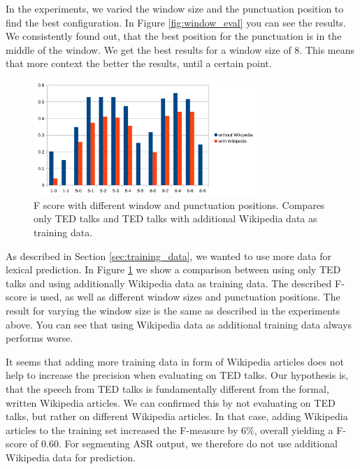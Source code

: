 In the experiments, we varied the window size and the punctuation position to find the best configuration.
In Figure \ref{fig:window_eval} you can see the results.
We consistently found out, that the best position for the punctuation is in the middle of the window.
We get the best results for a window size of 8.
This means that more context the better the results, until a certain point.

\begin{figure}[ht]
    \centering
    \includegraphics[width=0.75\textwidth]{img/window_wiki_eval.png}
    \caption{F score with different window and punctuation positions. Compares only TED talks and TED talks with additional Wikipedia data as training data.}
    \label{fig:window_wiki_eval}
\end{figure}

As described in Section \ref{sec:training_data}, we wanted to use more data for lexical prediction.
In Figure \ref{fig:window_wiki_eval} we show a comparison between using only TED talks and using additionally Wikipedia data as training data.
The described F-score is used, as well as different window sizes and punctuation positions.
The result for varying the window size is the same as described in the experiments above.
You can see that using Wikipedia data as additional training data always performs worse.

It seems that adding more training data in form of Wikipedia articles does not help to increase the precision when evaluating on TED talks.
Our hypothesis is, that the speech from TED talks is fundamentally different from the formal, written Wikipedia articles.
We can confirmed this by not evaluating on TED talks, but rather on different Wikipedia articles.
In that case, adding Wikipedia articles to the training set increased the F-measure by 6\%, overall yielding a F-score of 0.60.
For segmenting ASR output, we therefore do not use additional Wikipedia data for prediction.

